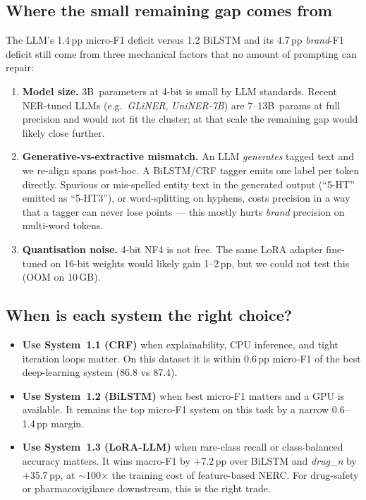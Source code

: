 \documentclass[a4paper,12pt]{article}
\begin{document}
\subsection{Where the small remaining gap comes from}

The LLM's 1.4\,pp micro-F1 deficit versus 1.2 BiLSTM and its 4.7\,pp
\textit{brand}-F1 deficit still come from three mechanical factors
that no amount of prompting can repair:

\begin{enumerate}[nosep]
    \item \textbf{Model size.} 3B~parameters at 4-bit is small by LLM
    standards. Recent NER-tuned LLMs (e.g.\ \textit{GLiNER},
    \textit{UniNER-7B}) are 7--13B~params at full precision and would
    not fit the cluster; at that scale the remaining gap would likely
    close further.
    \item \textbf{Generative-vs-extractive mismatch.} An LLM
    \emph{generates} tagged text and we re-align spans post-hoc. A
    BiLSTM/CRF tagger emits one label per token directly. Spurious
    or mis-spelled entity text in the generated output (``5{-}HT''
    emitted as ``5-HT3''), or word-splitting on hyphens, costs
    precision in a way that a tagger can never lose points --- this
    mostly hurts \textit{brand} precision on multi-word tokens.
    \item \textbf{Quantisation noise.} 4-bit NF4 is not free. The
    same LoRA adapter fine-tuned on 16-bit weights would likely
    gain 1--2\,pp, but we could not test this (OOM on 10\,GB).
\end{enumerate}

\subsection{When is each system the right choice?}

\begin{itemize}[nosep]
    \item \textbf{Use System~1.1 (CRF)} when explainability, CPU
    inference, and tight iteration loops matter. On this dataset it is
    within 0.6\,pp micro-F1 of the best deep-learning system
    (86.8 vs 87.4).
    \item \textbf{Use System~1.2 (BiLSTM)} when best micro-F1 matters
    and a GPU is available. It remains the top micro-F1 system on
    this task by a narrow 0.6--1.4\,pp margin.
    \item \textbf{Use System~1.3 (LoRA-LLM)} when rare-class recall or
    class-balanced accuracy matters. It wins macro-F1 by
    $+$7.2\,pp over BiLSTM and \textit{drug\_n} by $+$35.7\,pp, at
    $\sim$100$\times$ the training cost of feature-based NERC. For
    drug-safety or pharmacovigilance downstream, this is the right
    trade.
\end{itemize}
\end{document}
